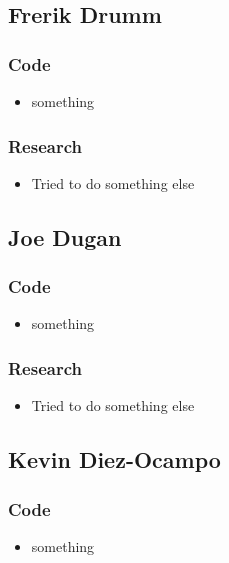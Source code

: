 \documentclass[10pt,a4paper]{article}
\begin{document}
\subsection*{Frerik Drumm}

\subsubsection*{Code}
\begin{itemize}
\item something

\end{itemize}
\subsubsection*{Research}
\begin{itemize}
\item Tried to do something else

\end{itemize}


\subsection*{Joe Dugan}

\subsubsection*{Code}
\begin{itemize}
\item something

\end{itemize}
\subsubsection*{Research}
\begin{itemize}
\item Tried to do something else

\end{itemize}

\subsection*{Kevin Diez-Ocampo}

\subsubsection*{Code}
\begin{itemize}
\item something

\end{itemize}
\end{document}
